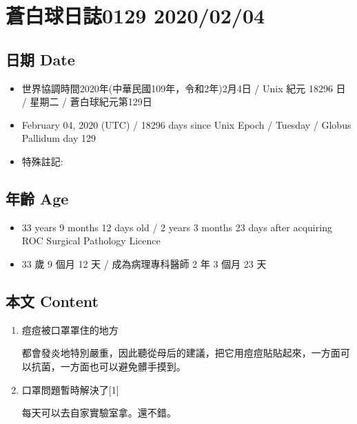 \documentclass[
]{article}
\providecommand{\tightlist}{%
  \setlength{\itemsep}{0pt}\setlength{\parskip}{0pt}}
\begin{document}
\hypertarget{ux84bcux767dux7403ux65e5ux8a8c0129-20200204}{%
\section{蒼白球日誌0129
2020/02/04}\label{ux84bcux767dux7403ux65e5ux8a8c0129-20200204}}

\hypertarget{ux65e5ux671f-date-3}{%
\subsection{日期 Date}\label{ux65e5ux671f-date-3}}

\begin{itemize}
\tightlist
\item
  世界協調時間2020年(中華民國109年，令和2年)2月4日 / Unix 紀元 18296 日
  / 星期二 / 蒼白球紀元第129日
\item
  February 04, 2020 (UTC) / 18296 days since Unix Epoch / Tuesday /
  Globus Pallidum day 129
\item
  特殊註記:
\end{itemize}

\hypertarget{ux5e74ux9f61-age-3}{%
\subsection{年齡 Age}\label{ux5e74ux9f61-age-3}}

\begin{itemize}
\tightlist
\item
  33 years 9 months 12 days old / 2 years 3 months 23 days after
  acquiring ROC Surgical Pathology Licence
\item
  33 歲 9 個月 12 天 / 成為病理專科醫師 2 年 3 個月 23 天
\end{itemize}

\hypertarget{ux672cux6587-content-3}{%
\subsection{本文 Content}\label{ux672cux6587-content-3}}

\begin{enumerate}
\def\labelenumi{\arabic{enumi}.}
\item
  痘痘被口罩罩住的地方

  都會發炎地特別嚴重，因此聽從母后的建議，把它用痘痘貼貼起來，一方面可以抗菌，一方面也可以避免髒手摸到。
\item
  口罩問題暫時解決了{[}1{]}

  每天可以去自家實驗室拿。還不錯。
\end{enumerate}
\end{document}
